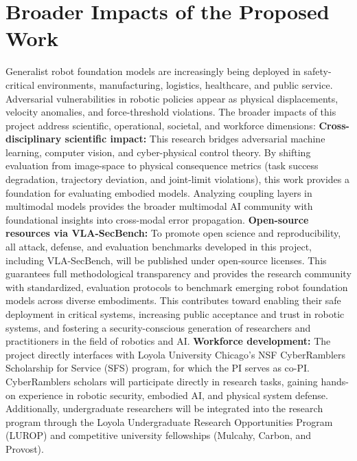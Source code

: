 \section{Broader Impacts of the Proposed Work} \label{sec:broader_impacts}

Generalist robot foundation models are increasingly being deployed in safety-critical environments, \eg manufacturing, logistics, healthcare, and public service. Adversarial vulnerabilities in robotic policies appear as physical displacements, velocity anomalies, and force-threshold violations. The broader impacts of this project address scientific, operational, societal, and workforce dimensions:
 \textbf{Cross-disciplinary scientific impact:} 
This research bridges adversarial machine learning, computer vision, and cyber-physical control theory. By shifting evaluation from image-space to physical consequence metrics (task success degradation, trajectory deviation, and joint-limit violations), this work provides a foundation for evaluating embodied models. Analyzing coupling layers in multimodal models provides the broader multimodal AI community with foundational insights into cross-modal error propagation. 
 \textbf{Open-source resources via VLA-SecBench:} 
To promote open science and reproducibility, all attack, defense, and evaluation benchmarks developed in this project, including {VLA-SecBench}, will be published under open-source licenses. This guarantees full methodological transparency and provides the research community with standardized, evaluation protocols to benchmark emerging robot foundation models across diverse embodiments.
This contributes toward enabling their safe deployment in critical systems, increasing public acceptance and trust in robotic systems, and fostering a security-conscious generation of researchers and practitioners in the field of robotics and AI.
 \textbf{Workforce development:} 
The project directly interfaces with Loyola University Chicago's NSF CyberRamblers Scholarship for Service (SFS) program, for which the PI serves as co-PI. CyberRamblers scholars will participate directly in research tasks, gaining hands-on experience in robotic security, embodied AI, and physical system defense. Additionally, undergraduate researchers will be integrated into the research program through the Loyola Undergraduate Research Opportunities Program (LUROP) and competitive university fellowships (Mulcahy, Carbon, and Provost).